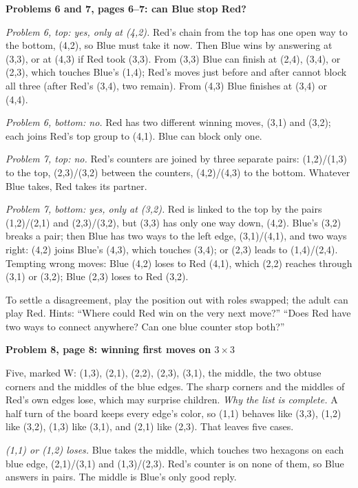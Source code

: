 \documentclass[11pt]{article}
\newcommand{\sub}[1]{\par\textbf{#1}\par\nopagebreak}
\newcommand{\x}{\ensuremath{\times}}
\begin{document}
\sub{Problems 6 and 7, pages 6--7: can Blue stop Red?}
\begin{center}\end{center}
\emph{Problem 6, top: yes, only at (4,2).} Red's chain from the top has one open way to the bottom, (4,2), so Blue must take it now. Then Blue wins by answering at (3,3), or at (4,3) if Red took (3,3). From (3,3) Blue can finish at (2,4), (3,4), or (2,3), which touches Blue's (1,4); Red's moves just before and after cannot block all three (after Red's (3,4), two remain). From (4,3) Blue finishes at (3,4) or (4,4).

\emph{Problem 6, bottom: no.} Red has two different winning moves, (3,1) and (3,2); each joins Red's top group to (4,1). Blue can block only one.

\emph{Problem 7, top: no.} Red's counters are joined by three separate pairs: (1,2)/(1,3) to the top, (2,3)/(3,2) between the counters, (4,2)/(4,3) to the bottom. Whatever Blue takes, Red takes its partner.

\emph{Problem 7, bottom: yes, only at (3,2).} Red is linked to the top by the pairs (1,2)/(2,1) and (2,3)/(3,2), but (3,3) has only one way down, (4,2). Blue's (3,2) breaks a pair; then Blue has two ways to the left edge, (3,1)/(4,1), and two ways right: (4,2) joins Blue's (4,3), which touches (3,4); or (2,3) leads to (1,4)/(2,4). Tempting wrong moves: Blue (4,2) loses to Red (4,1), which (2,2) reaches through (3,1) or (3,2); Blue (2,3) loses to Red (3,2).

To settle a disagreement, play the position out with roles swapped; the adult can play Red. Hints: ``Where could Red win on the very next move?'' ``Does Red have two ways to connect anywhere? Can one blue counter stop both?''

\sub{Problem 8, page 8: winning first moves on $3\x3$}
\vspace{-\baselineskip}\noindent\begin{minipage}[t]{0.80\textwidth}\vspace{0pt}
Five, marked W: (1,3), (2,1), (2,2), (2,3), (3,1), the middle, the two obtuse corners and the middles of the blue edges. The sharp corners and the middles of Red's own edges lose, which may surprise children. \emph{Why the list is complete.} A half turn of the board keeps every edge's color, so (1,1) behaves like (3,3), (1,2) like (3,2), (1,3) like (3,1), and (2,1) like (2,3). That leaves five cases.
\end{minipage}\hfill
\begin{minipage}[t]{0.17\textwidth}\vspace{0pt}\centering\end{minipage}\par
\emph{(1,1) or (1,2) loses.} Blue takes the middle, which touches two hexagons on each blue edge, (2,1)/(3,1) and (1,3)/(2,3). Red's counter is on none of them, so Blue answers in pairs. The middle is Blue's only good reply.
\end{document}

